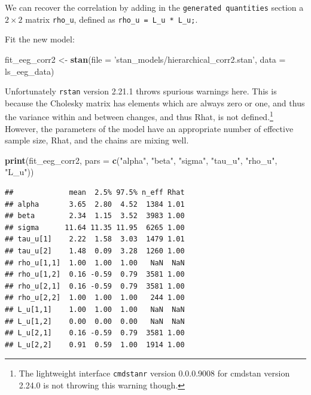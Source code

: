 \documentclass[12pt,]{krantz}
\newenvironment{Shaded}{\begin{snugshade}}{\end{snugshade}}
\newcommand{\KeywordTok}[1]{\textcolor[rgb]{0.13,0.29,0.53}{\textbf{#1}}}
\newcommand{\DataTypeTok}[1]{\textcolor[rgb]{0.13,0.29,0.53}{#1}}
\newcommand{\StringTok}[1]{\textcolor[rgb]{0.31,0.60,0.02}{#1}}
\newcommand{\NormalTok}[1]{#1}
\theoremstyle{definition}
\theoremstyle{definition}
\theoremstyle{definition}
\theoremstyle{remark}
\begin{document}
We can recover the correlation by adding in the
\texttt{generated\ quantities} section a \(2 \times 2\) matrix
\texttt{rho\_u}, defined as
\texttt{rho\_u\ =\ L\_u\ *\ L\_u\textquotesingle{};}.

Fit the new model:

\begin{Shaded}
\begin{Highlighting}[]
\NormalTok{fit_eeg_corr2 <-}\StringTok{ }\KeywordTok{stan}\NormalTok{(}\DataTypeTok{file =} \StringTok{'stan_models/hierarchical_corr2.stan'}\NormalTok{, }
                 \DataTypeTok{data =}\NormalTok{ ls_eeg_data)}
\end{Highlighting}
\end{Shaded}

Unfortunately \texttt{rstan} version 2.21.1 throws spurious warnings
here. This is because the Cholesky matrix has elements which are always
zero or one, and thus the variance within and between changes, and thus
Rhat, is not defined.\footnote{The lightweight interface
  \texttt{cmdstanr} version 0.0.0.9008 for cmdstan version 2.24.0 is not
  throwing this warning though.} However, the parameters of the model
have an appropriate number of effective sample size, Rhat, and the
chains are mixing well.

\begin{Shaded}
\begin{Highlighting}[]
\KeywordTok{print}\NormalTok{(fit_eeg_corr2, }\DataTypeTok{pars =}
                       \KeywordTok{c}\NormalTok{(}\StringTok{"alpha"}\NormalTok{, }\StringTok{"beta"}\NormalTok{, }\StringTok{"sigma"}\NormalTok{, }\StringTok{"tau_u"}\NormalTok{, }\StringTok{"rho_u"}\NormalTok{, }\StringTok{"L_u"}\NormalTok{))}
\end{Highlighting}
\end{Shaded}

\begin{verbatim}
##             mean  2.5% 97.5% n_eff Rhat
## alpha       3.65  2.80  4.52  1384 1.01
## beta        2.34  1.15  3.52  3983 1.00
## sigma      11.64 11.35 11.95  6265 1.00
## tau_u[1]    2.22  1.58  3.03  1479 1.01
## tau_u[2]    1.48  0.09  3.28  1260 1.00
## rho_u[1,1]  1.00  1.00  1.00   NaN  NaN
## rho_u[1,2]  0.16 -0.59  0.79  3581 1.00
## rho_u[2,1]  0.16 -0.59  0.79  3581 1.00
## rho_u[2,2]  1.00  1.00  1.00   244 1.00
## L_u[1,1]    1.00  1.00  1.00   NaN  NaN
## L_u[1,2]    0.00  0.00  0.00   NaN  NaN
## L_u[2,1]    0.16 -0.59  0.79  3581 1.00
## L_u[2,2]    0.91  0.59  1.00  1914 1.00
\end{verbatim}
\end{document}
